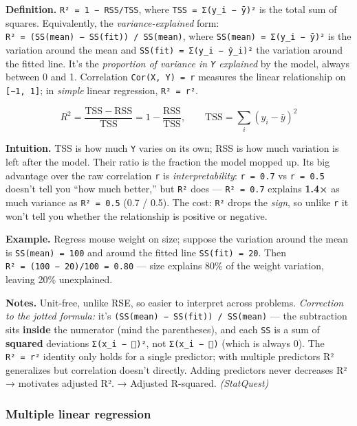 \documentclass[
  10pt,
  letterpaper,
  onecolumn]{article}
\begin{document}
\textbf{Definition.} \texttt{R²\ =\ 1\ −\ RSS/TSS}, where
\texttt{TSS\ =\ Σ(y\_i\ −\ ȳ)²} is the total sum of squares.
Equivalently, the \emph{variance-explained} form:
\texttt{R²\ =\ (SS(mean)\ −\ SS(fit))\ /\ SS(mean)}, where
\texttt{SS(mean)\ =\ Σ(y\_i\ −\ ȳ)²} is the variation around the mean
and \texttt{SS(fit)\ =\ Σ(y\_i\ −\ ŷ\_i)²} the variation around the
fitted line. It's the \emph{proportion of variance in \texttt{Y}
explained} by the model, always between 0 and 1. Correlation
\texttt{Cor(X,\ Y)\ =\ r} measures the linear relationship on
\texttt{{[}−1,\ 1{]}}; in \emph{simple} linear regression,
\texttt{R²\ =\ r²}.

\begin{equation*}
R^2=\frac{\mathrm{TSS}-\mathrm{RSS}}{\mathrm{TSS}}=1-\frac{\mathrm{RSS}}{\mathrm{TSS}},
\qquad
\mathrm{TSS}=\sum_i (y_i-\bar y)^2
\end{equation*}

\textbf{Intuition.} TSS is how much \texttt{Y} varies on its own; RSS is
how much variation is left after the model. Their ratio is the fraction
the model mopped up. Its big advantage over the raw correlation
\texttt{r} is \emph{interpretability}: \texttt{r\ =\ 0.7} vs
\texttt{r\ =\ 0.5} doesn't tell you ``how much better,'' but \texttt{R²}
does --- \texttt{R²\ =\ 0.7} explains \textbf{1.4×} as much variance as
\texttt{R²\ =\ 0.5} (0.7 / 0.5). The cost: \texttt{R²} drops the
\emph{sign}, so unlike \texttt{r} it won't tell you whether the
relationship is positive or negative.

\textbf{Example.} Regress mouse weight on size; suppose the variation
around the mean is \texttt{SS(mean)\ =\ 100} and around the fitted line
\texttt{SS(fit)\ =\ 20}. Then \texttt{R²\ =\ (100\ −\ 20)/100\ =\ 0.80}
--- size explains 80\% of the weight variation, leaving 20\%
unexplained.

\textbf{Notes.} Unit-free, unlike RSE, so easier to interpret across
problems. \emph{Correction to the jotted formula:} it's
\texttt{(SS(mean)\ −\ SS(fit))\ /\ SS(mean)} --- the subtraction sits
\textbf{inside} the numerator (mind the parentheses), and each
\texttt{SS} is a sum of \textbf{squared} deviations
\texttt{Σ(x\_i\ −\ )²}, not \texttt{Σ(x\_i\ −\ )} (which is always 0).
The \texttt{R²\ =\ r²} identity only holds for a single predictor; with
multiple predictors R² generalizes but correlation doesn't directly.
Adding predictors never decreases R² → motivates adjusted R². → Adjusted
R-squared. \emph{(StatQuest)}

\hypertarget{multiple-linear-regression}{%
\subsubsection{Multiple linear
regression}\label{multiple-linear-regression}}
\end{document}
